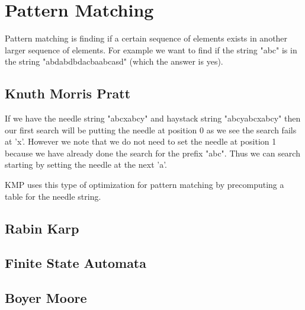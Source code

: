 \documentclass[11pt,oneside]{book}
\begin{document}
\section{Pattern Matching}

Pattern matching is finding if a certain sequence of elements exists in another larger sequence of elements. For example we want to find if the string "abc" is in the string "abdabdbdacbaabcasd" (which the answer is yes).

\subsection{Knuth Morris Pratt}

If we have the needle string "abcxabcy" and haystack string "abcyabcxabcy" then our first search will be putting the needle at position 0 as we see the search fails at 'x'. However we note that we do not need to set the needle at position 1 because we have already done the search for the prefix "abc". Thus we can search starting by setting the needle at the next 'a'.

KMP uses this type of optimization for pattern matching by precomputing a table for the needle string.

\subsection{Rabin Karp}

\subsection{Finite State Automata}

\subsection{Boyer Moore}
\end{document}
